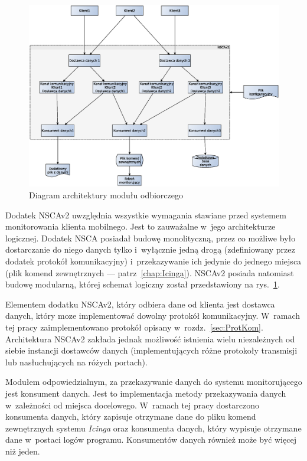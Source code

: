 \begin{figure}[ht]
  \caption{Diagram architektury modułu odbiorczego}
  \label{fig:odbiorczy}
  \centering
\includegraphics[width=1\textwidth]{img/odbiorczy}
\end{figure}

Dodatek NSCAv2 uwzględnia wszystkie wymagania stawiane przed systemem
monitorowania klienta mobilnego. Jest to zauważalne w~jego
architekturze logicznej. Dodatek NSCA posiadał budowę monolityczną,
przez co możliwe było dostarczanie do niego danych tylko i~wyłącznie
jedną drogą (zdefiniowany przez dodatek protokół komunikacyjny)
i~przekazywanie ich jedynie do jednego miejsca (plik komend
zewnętrznych --- patrz~\ref{chap:Icinga}). NSCAv2 posiada natomiast
budowę modularną, której schemat logiczny został przedstawiony na
rys.~\ref{fig:odbiorczy}.

Elementem dodatku NSCAv2, który odbiera dane od klienta jest dostawca
danych, który moze implementować dowolny protokół
komunikacyjny. W~ramach tej pracy zaimplementowano protokół opisany
w~rozdz.~\ref{sec:ProtKom}. Architektura NSCAv2 zakłada jednak
możliwość istnienia wielu niezależnych od siebie instancji dostawców
danych (implementujących różne protokoły transmisji lub nasłuchujących
na różych portach).

Modułem odpowiedzialnym, za przekazywanie danych do systemu
monitorującego jest konsument danych. Jest to implementacja metody
przekazywania danych w~zależności od miejsca docelowego. W~ramach tej
pracy dostarczono konsumenta danych, który zapisuje otrzymane dane do
pliku komend zewnętrznych systemu {\em Icinga} oraz konsumenta danych, który
wypisuje otrzymane dane w~postaci logów programu. Konsumentów danych
również może być więcej niż jeden.

